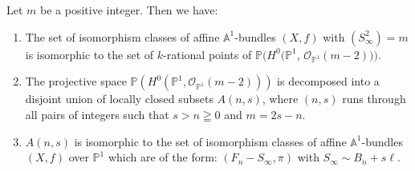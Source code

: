 \begin{theorem*}
Let $m$ be a positive integer. Then we have:
\begin{enumerate}
\renewcommand{\labelenumi}{\rm(\theenumi)}
\item The set of isomorphism classes of affine
  $\mathbb{A}^{1}$-bundles $(X,f)$ with $(S^{2}_{\infty})=m$ is
  isomorphic to the set of $k$-rational points of
  $\mathbb{P}(H^{0}(\mathbb{P}^{1}$, $\mathscr{O}_{\mathbb{P}^{1}}(m-2)))$. 

\item The projective space
  $\mathbb{P}(H^{0}(\mathbb{P}^{1},\mathscr{O}_{\mathbb{P}^{1}}(m-2)))$
  is decomposed into a disjoint union of locally closed subsets
  $A(n,s)$, where $(n,s)$ runs through all pairs of integers such that
  $s>n\geqq 0$ and $m=2s-n$.

\item $A(n,s)$ is isomorphic to the set of isomorphism classes of
  affine $\mathbb{A}^{1}$-bundles $(X,f)$ over $\mathbb{P}^{1}$ which
  are of the form: $(F_{n}-S_{\infty},\pi)$ with $S_{\infty}\sim
  B_{n}+s\ell$. 
\end{enumerate}
\end{theorem*}


